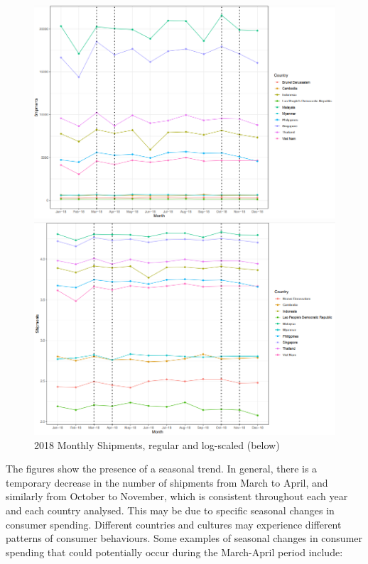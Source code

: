 \documentclass{article}
\begin{document}
\begin{figure}[H]
    \begin{minipage}[c]{1\linewidth}
        \includegraphics[width=\linewidth]{images/Line Plots/Seasonal/2018_seasonal_log.png}
    \end{minipage}
    \hfill
    \begin{minipage}[c]{1\linewidth}
        \includegraphics[width=\linewidth]{images/Line Plots/Seasonal/2018_seasonal.png}
        \caption{2018 Monthly Shipments, regular and log-scaled (below)}
    \end{minipage}
\end{figure}

\newpage

\noindent The figures show the presence of a seasonal trend. In general, there is a temporary decrease in the number of shipments from March to April, and similarly from October to November, which is consistent throughout each year and each country analysed. This may be due to specific seasonal changes in consumer spending.  Different countries and cultures may experience different patterns of consumer behaviours. Some examples of seasonal changes in consumer spending that could potentially occur during the March-April period include:
\end{document}

